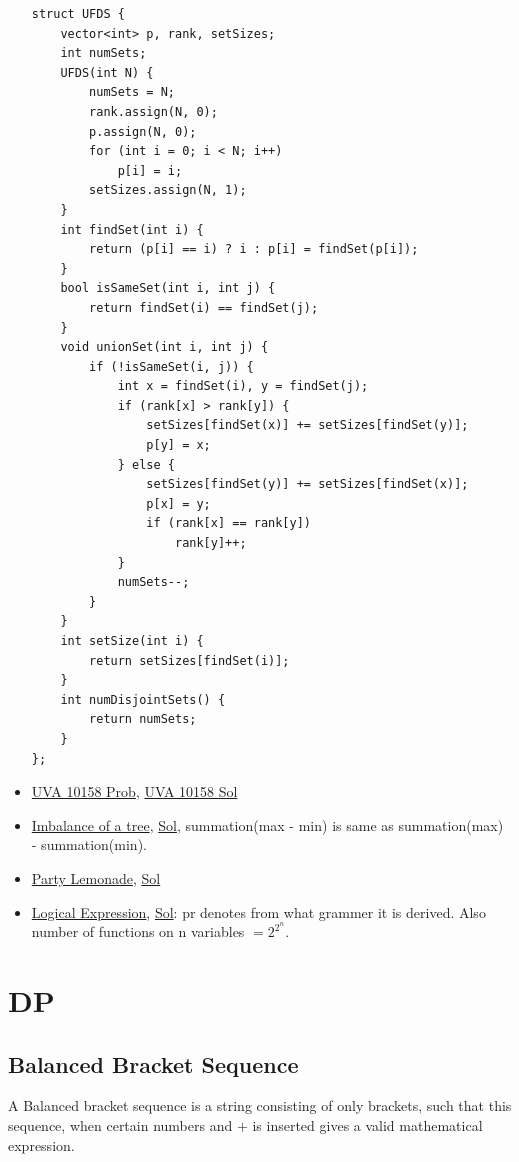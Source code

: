 \documentclass[8pt, a4paper, oneside, twocolumn]{extarticle}
\begin{document}
\begin{itemize}
    \begin{verbatim}
struct UFDS {
    vector<int> p, rank, setSizes;
    int numSets;
    UFDS(int N) {
        numSets = N;
        rank.assign(N, 0);
        p.assign(N, 0);
        for (int i = 0; i < N; i++)
            p[i] = i;
        setSizes.assign(N, 1);
    }
    int findSet(int i) {
        return (p[i] == i) ? i : p[i] = findSet(p[i]);
    }
    bool isSameSet(int i, int j) {
        return findSet(i) == findSet(j);
    }
    void unionSet(int i, int j) {
        if (!isSameSet(i, j)) {
            int x = findSet(i), y = findSet(j);
            if (rank[x] > rank[y]) {
                setSizes[findSet(x)] += setSizes[findSet(y)];
                p[y] = x;
            } else {
                setSizes[findSet(y)] += setSizes[findSet(x)];
                p[x] = y;
                if (rank[x] == rank[y])
                    rank[y]++;
            }
            numSets--;
        }
    }
    int setSize(int i) {
        return setSizes[findSet(i)];
    }
    int numDisjointSets() {
        return numSets;
    }
};
    \end{verbatim}
    \item \href {https://uva.onlinejudge.org/external/101/10158.pdf}{UVA 10158 Prob}, \href {https://gist.github.com/sourabh2311/3a2daf2a9f77104a94d1db9af8b40b1a}{UVA 10158 Sol}
    \item \href {https://codeforces.com/contest/915/problem/F}{Imbalance of a tree}, \href {https://github.com/sourabh2311/Competitive-Programming/blob/master/CF/ER36/F.cpp}{Sol}, summation(max - min) is same as summation(max) - summation(min).
    \item \href {https://codeforces.com/contest/913/problem/C}{Party Lemonade}, \href {https://codeforces.com/contest/913/submission/34067096}{Sol}
    \item \href {https://codeforces.com/contest/913/problem/E}{Logical Expression}, \href {https://codeforces.com/contest/913/submission/34071120}{Sol}: pr denotes from what grammer it is derived. Also number of functions on n variables $= 2^{2^n}$.


\end{itemize}
\section{DP}
\subsection{Balanced Bracket Sequence}
A Balanced bracket sequence is a string consisting of only brackets, such that this sequence, when certain numbers and $+$ is inserted gives a valid mathematical expression.
\end{document}
